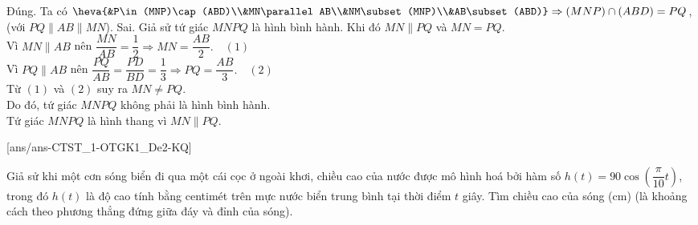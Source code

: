 \begin{ex}
{\begin{itemchoice}
			\itemch Đúng. Ta có $\heva{&P\in(MNP)\cap (ABD)\\&MN\parallel AB\\&NM\subset(MNP)\\&AB\subset (ABD)}\Rightarrow(MNP)\cap (ABD)=PQ$, (với $PQ\parallel AB\parallel MN$).
			\itemch Sai. Giả sử tứ giác $MNPQ$ là hình bình hành. Khi đó $MN\parallel PQ$ và $MN=PQ$.\\
			Vì $MN\parallel AB$ nên $\dfrac{MN}{AB}=\dfrac{1}{2}\Rightarrow MN=\dfrac{AB}{2}.\quad(1)$\\
			Vì $PQ\parallel AB$ nên $\dfrac{PQ}{AB}=\dfrac{PD}{BD}=\dfrac{1}{3}\Rightarrow PQ=\dfrac{AB}{3}.\quad(2)$\\
			Từ $(1)$ và $(2)$ suy ra $MN\ne PQ$.\\
			Do đó, tứ giác $MNPQ$ không phải là hình bình hành.\\
			Tứ giác $MNPQ$ là hình thang vì $MN\parallel PQ$.
		\end{itemchoice}
	}
\end{ex}
[ans/ans-CTST_1-OTGK1_De2-KQ]
\caukq
\begin{ex}%
	Giả sử khi một cơn sóng biển đi qua một cái cọc ở ngoài khơi, chiều cao của nước được mô hình hoá bởi hàm số $h(t)=90 \cos \left(\dfrac{\pi}{10}t\right)$, trong đó $h(t)$ là độ cao tính bằng centimét trên mực nước biển trung bình tại thời điểm $t$ giây. Tìm chiều cao của sóng (cm) (là khoảng cách theo phương thẳng đứng giữa đáy và đỉnh của sóng).\\
\end{ex}

